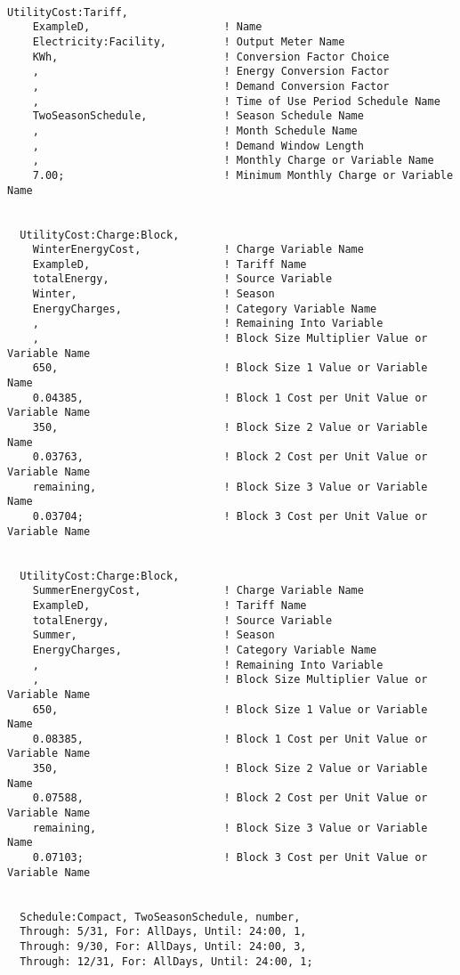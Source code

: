 \begin{lstlisting}

UtilityCost:Tariff,
    ExampleD,                     ! Name
    Electricity:Facility,         ! Output Meter Name
    KWh,                          ! Conversion Factor Choice
    ,                             ! Energy Conversion Factor
    ,                             ! Demand Conversion Factor
    ,                             ! Time of Use Period Schedule Name
    TwoSeasonSchedule,            ! Season Schedule Name
    ,                             ! Month Schedule Name
    ,                             ! Demand Window Length
    ,                             ! Monthly Charge or Variable Name
    7.00;                         ! Minimum Monthly Charge or Variable Name


  UtilityCost:Charge:Block,
    WinterEnergyCost,             ! Charge Variable Name
    ExampleD,                     ! Tariff Name
    totalEnergy,                  ! Source Variable
    Winter,                       ! Season
    EnergyCharges,                ! Category Variable Name
    ,                             ! Remaining Into Variable
    ,                             ! Block Size Multiplier Value or Variable Name
    650,                          ! Block Size 1 Value or Variable Name
    0.04385,                      ! Block 1 Cost per Unit Value or Variable Name
    350,                          ! Block Size 2 Value or Variable Name
    0.03763,                      ! Block 2 Cost per Unit Value or Variable Name
    remaining,                    ! Block Size 3 Value or Variable Name
    0.03704;                      ! Block 3 Cost per Unit Value or Variable Name


  UtilityCost:Charge:Block,
    SummerEnergyCost,             ! Charge Variable Name
    ExampleD,                     ! Tariff Name
    totalEnergy,                  ! Source Variable
    Summer,                       ! Season
    EnergyCharges,                ! Category Variable Name
    ,                             ! Remaining Into Variable
    ,                             ! Block Size Multiplier Value or Variable Name
    650,                          ! Block Size 1 Value or Variable Name
    0.08385,                      ! Block 1 Cost per Unit Value or Variable Name
    350,                          ! Block Size 2 Value or Variable Name
    0.07588,                      ! Block 2 Cost per Unit Value or Variable Name
    remaining,                    ! Block Size 3 Value or Variable Name
    0.07103;                      ! Block 3 Cost per Unit Value or Variable Name


  Schedule:Compact, TwoSeasonSchedule, number,
  Through: 5/31, For: AllDays, Until: 24:00, 1,
  Through: 9/30, For: AllDays, Until: 24:00, 3,
  Through: 12/31, For: AllDays, Until: 24:00, 1;
\end{lstlisting}

